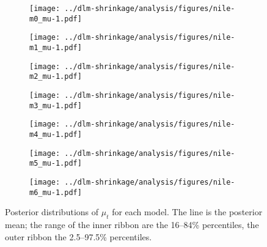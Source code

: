 \begin{figure}[htpb!]
  \centering
  \begin{subfigure}[b]{0.5\linewidth}
    \texttt{[image: ../dlm-shrinkage/analysis/figures/nile-m0\_mu-1.pdf]}
    \caption{}
  \end{subfigure}%
  \begin{subfigure}[b]{0.5\linewidth}
    \texttt{[image: ../dlm-shrinkage/analysis/figures/nile-m1\_mu-1.pdf]}
    \caption{}
  \end{subfigure}
  \begin{subfigure}[b]{0.5\linewidth}
    \texttt{[image: ../dlm-shrinkage/analysis/figures/nile-m2\_mu-1.pdf]}    
    \caption{}
  \end{subfigure}%
  \begin{subfigure}[b]{0.5\linewidth}
    \texttt{[image: ../dlm-shrinkage/analysis/figures/nile-m3\_mu-1.pdf]}
    \caption{}
  \end{subfigure}
  \begin{subfigure}[b]{0.5\linewidth}
    \texttt{[image: ../dlm-shrinkage/analysis/figures/nile-m4\_mu-1.pdf]}    
    \caption{}
  \end{subfigure}%
  \begin{subfigure}[b]{0.5\linewidth}
    \texttt{[image: ../dlm-shrinkage/analysis/figures/nile-m5\_mu-1.pdf]}
    \caption{}
  \end{subfigure}
  \begin{subfigure}[b]{0.5\linewidth}
    \texttt{[image: ../dlm-shrinkage/analysis/figures/nile-m6\_mu-1.pdf]}    
    \caption{}
  \end{subfigure}
  \caption{Posterior distributions of $\mu_t$ for each model. The line is the posterior mean; the range of the inner ribbon are the 16--84\% percentiles, the outer ribbon the 2.5--97.5\% percentiles.}
  \label{dlm:fig:nile_mu_posterior}
\end{figure}


